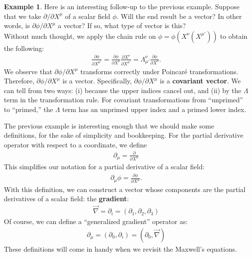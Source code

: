 \documentclass{book}
\theoremstyle{definition}
\newtheorem{exmp}{Example}[section]
\begin{document}
\begin{exmp}
	Here is an interesting follow-up to the previous example. Suppose that we take ${\partial }/{\partial X^\mu}$ of a scalar field $\phi$. Will the end result be a vector? In other words, is ${\partial \phi}/{\partial X^\mu}$ a vector? If so, what type of vector is this?\\
	
	Without much thought, we apply the chain rule on $\phi = \phi\left(X^{\nu}\left(X^{\mu'} \right)  \right) $ to obtain the following:
	\begin{align*}
	\frac{\partial \phi}{\partial X^{\mu'}} = \frac{\partial \phi}{\partial X^{\nu}}\frac{\partial X^\nu}{\partial X^{\mu'}} = \Lambda^\nu_{\mu'}\frac{\partial \phi}{\partial X^{\nu}}.
	\end{align*}
	We observe that $\partial \phi / \partial X^{\mu}$ transforms correctly under Poincar\'e transformations. Therefore, $\partial \phi / \partial X^{\mu}$ is a vector. Specifically, $\partial \phi / \partial X^{\mu}$ is a \textbf{covariant vector}. We can tell from two ways: (i) because the upper indices cancel out, and (ii) by the $\Lambda$ term in the transformation rule. For covariant transformations from ``unprimed'' to ``primed,'' the $\Lambda$ term has an unprimed upper index and a primed lower index.\\
\end{exmp}

The previous example is interesting enough that we should make some definitions, for the sake of simplicity and bookkeeping. For the partial derivative operator with respect to a coordinate, we define
\begin{align*}
\boxed{\partial_\mu = \frac{\partial }{\partial X^\mu}}
\end{align*}
This simplifies our notation for a partial derivative of a scalar field:
\begin{align*}
\partial_\mu \phi= \frac{\partial \phi}{\partial X^\mu}.
\end{align*}
With this definition, we can construct a vector whose components are the partial derivatives of a scalar field: the \textbf{gradient}:
\begin{align*}
\boxed{\vec{\nabla} = \partial_i = (\partial_1, \partial_2, \partial_3)}
\end{align*}
Of course, we can define a ``generalized gradient'' operator as:
\begin{align*}
\boxed{\partial_\mu = \left( \partial_0, \partial_i\right)  = \left( \partial_0, \vec{\nabla}\right) }
\end{align*}
These definitions will come in handy when we revisit the Maxwell's equations.\\
\end{document}
